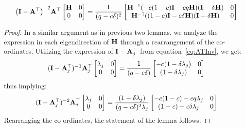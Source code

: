 \begin{lemma}\label{lem:com2}
	\begin{align*}
	{\left(\mathbf{I}- \mathbf{A}^{\top}\right)}^{-2} \mathbf{A}^{\top} \begin{bmatrix}
	\mathbf{H} & 0 \\ 0 & 0
	\end{bmatrix} = \frac{1}{(q-c\delta)^2}\begin{bmatrix}\mathbf{H}^{-1}(-c(1-c)\mathbf{I}-cq\mathbf{H})(\mathbf{I}-\delta\mathbf{H})&0\\\mathbf{H}^{-1}((1-c)\mathbf{I}-c\delta\mathbf{H})(\mathbf{I}-\delta\mathbf{H})&0\end{bmatrix}
	\end{align*}
\end{lemma}
\begin{proof}
In a similar argument as in previous two lemmas, we analyze the expression in each eigendirection of $\mathbf{H}$ through a rearrangement of the co-ordinates. Utilizing the expression of $\mathbf{I}-\mathbf{A}_j^{\top}$ from equation~\ref{eq:ATInv}, we get:
\begin{align}
\label{eq:intermediateEqn}
(\mathbf{I}-\mathbf{A}_j^{\top})^{-1}\mathbf{A}_j^{\top}\begin{bmatrix}\lambda_j&0\\0&0\end{bmatrix}
=\frac{1}{(q-c\delta)}\begin{bmatrix}-c(1-\delta\lambda_j)&0\\(1-\delta\lambda_j)&0\end{bmatrix}
\end{align}
thus implying:
\begin{align*}
(\mathbf{I}-\mathbf{A}_j^{\top})^{-2}\mathbf{A}_j^{\top}\begin{bmatrix}\lambda_j&0\\0&0\end{bmatrix}
=\frac{(1-\delta\lambda_j)}{(q-c\delta)^2\lambda_j}\begin{bmatrix}-c(1-c)-cq\lambda_j&0\\(1-c)-c\delta\lambda_j&0\end{bmatrix}
\end{align*}
Rearranging the co-ordinates, the statement of the lemma follows.
\end{proof}

